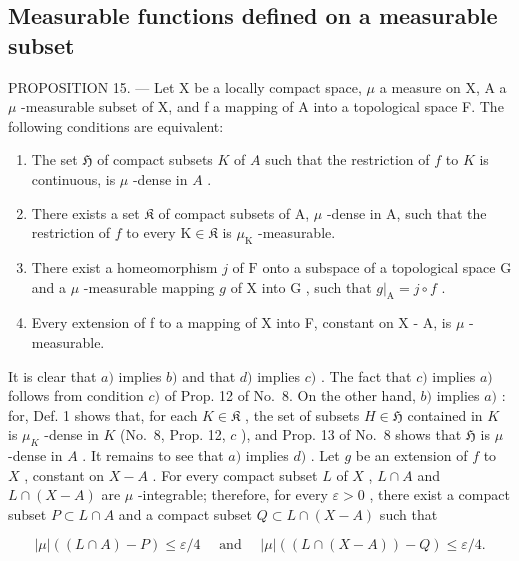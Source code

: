 \subsection{Measurable functions defined on a measurable subset}

PROPOSITION 15. --- Let X be a locally compact space, \(\mu\) a measure on X, A a \(\mu\) -measurable subset of X, and f a mapping of A into a topological space F. The following conditions are equivalent:

\begin{enumerate}
\def\labelenumi{\alph{enumi})}
\item
  The set \(\mathfrak{H}\) of compact subsets \(K\) of \(A\) such that the restriction of \(f\) to \(K\) is continuous, is \(\mu\) -dense in \(A\) .
\item
  There exists a set \(\mathfrak{K}\) of compact subsets of A, \(\mu\) -dense in A, such that the restriction of \(f\) to every \(\mathrm{K} \in \mathfrak{K}\) is \(\mu_{\mathrm{K}}\) -measurable.
\item
  There exist a homeomorphism \(j\) of \(\mathrm{F}\) onto a subspace of a topological space \(\mathrm{G}\) and a \(\mu\) -measurable mapping \(g\) of \(\mathrm{X}\) into \(\mathrm{G}\) , such that \(g|_{\mathrm{A}} = j \circ f\) .
\item
  Every extension of f to a mapping of X into F, constant on X - A, is \(\mu\) -measurable.
\end{enumerate}

It is clear that \(a)\) implies \(b)\) and that \(d)\) implies \(c)\) . The fact that \(c)\) implies \(a)\) follows from condition \(c)\) of Prop. 12 of No.~8. On the other hand, \(b)\) implies \(a)\) : for, Def. 1 shows that, for each \(K \in \mathfrak{K}\) , the set of subsets \(H \in \mathfrak{H}\) contained in \(K\) is \(\mu_{K}\) -dense in \(K\) (No.~8, Prop. 12, \(c\) ), and Prop. 13 of No.~8 shows that \(\mathfrak{H}\) is \(\mu\) -dense in \(A\) . It remains to see that \(a)\) implies \(d)\) . Let \(g\) be an extension of \(f\) to \(X\) , constant on \(X - A\) . For every compact subset \(L\) of \(X\) , \(L \cap A\) and \(L \cap (X - A)\) are \(\mu\) -integrable; therefore, for every \(\varepsilon > 0\) , there exist a compact subset \(P \subset L \cap A\) and a compact subset \(Q \subset L \cap (X - A)\) such that

\[
| \mu | ((L \cap A) - P) \leqslant \varepsilon / 4 \quad \text { and } \quad | \mu | ((L \cap (X - A)) - Q) \leqslant \varepsilon / 4.
\]

